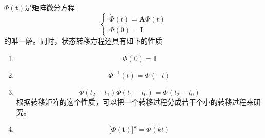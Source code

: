 \theorem[状态转移矩阵的性质]
$\bm{\varPhi(t)}$是矩阵微分方程
\begin{equation}
	\begin{cases}
		\, \dot{\bm{\varPhi}}(t) = \bm{A}\bm{\varPhi}(t)\\
		\, \bm{\varPhi}(0) = \bm{I}
	\end{cases}
\end{equation}
的唯一解。同时，状态转移方程还具有如下的性质
\begin{enumerate}
	\item 
	\begin{equation}
		\bm{\varPhi}(0) = \bm{I}
	\end{equation}
	\item 
	\begin{equation}
		\bm{\varPhi}^{-1}(t) = \bm{\varPhi}(-t)
	\end{equation}

	\item 
	\begin{equation}
		\bm{\varPhi}(t_2 - t_1)\bm{\varPhi}(t_1 - t_0) = \bm{\varPhi}(t_2 - t_0)
	\end{equation}
	根据转移矩阵的这个性质，可以把一个转移过程分成若干个小的转移过程来研究。
	
	\item 
	\begin{equation}
		\big[\bm{\varPhi(t)}\big]^k = \bm{\varPhi}(kt)
	\end{equation}
\end{enumerate}
\vspace*{0.5em}

